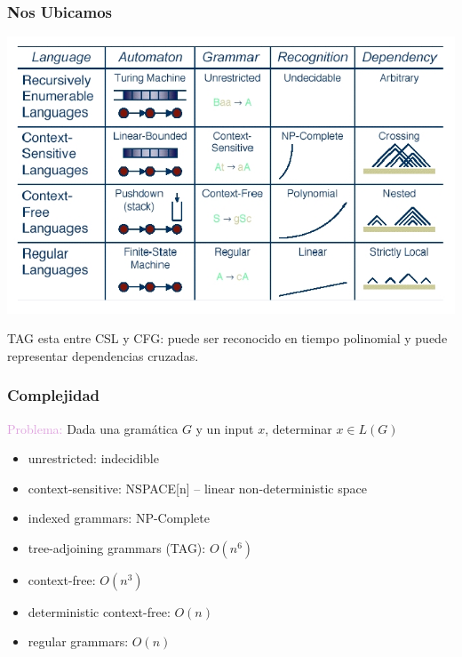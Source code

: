 \documentclass[compress,color=usenames]{beamer}
\newcommand{\mH}[1]{\textcolor{Plum}{#1}}
\begin{document}
\begin{frame}
\frametitle{Nos Ubicamos}

\begin{center}
\includegraphics[scale=.4]{pics/pic2-7.jpg}
\end{center}


TAG esta entre CSL y CFG: puede ser reconocido en tiempo polinomial y puede
representar dependencias cruzadas.
\end{frame}

\begin{frame}
\frametitle{Complejidad}

\mH{Problema:} Dada una gram\'atica $G$ y un input $x$, determinar $x \in L(G)$

\begin{itemize}
\item unrestricted: indecidible\pause 

\item context-sensitive: NSPACE[n] -- linear non-deterministic space \pause


\item indexed grammars: NP-Complete \pause


\item tree-adjoining grammars (TAG): $O(n^6)$ \pause


\item context-free: $O(n^3)$ \pause

\item deterministic context-free: $O(n)$ \pause

\item regular grammars: $O(n)$

\end{itemize}

\end{frame}
\end{document}
